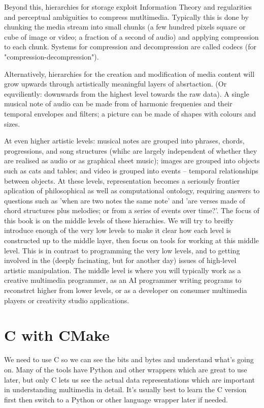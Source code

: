 \documentclass[oneside,english]{scrbook}
\begin{document}
Beyond this, hierarchies for storage exploit Information Theory and regularities and perceptual ambiguities to compress mutltimedia.  Typically this is done by chunking the media stream into small chunks (a few hundred pixels square or cube of image or video; a fraction of a second of audio) and applying compression to each chunk.   Systems for compression and decompression are called codecs (for "compression-decompression"). 

Alternatively, hierarchies for the creation and modification of media content will grow upwards through artistically meaningful layers of absrtaction. (Or equviliently: downwards from the highest level towards the raw data).   A single musical note of audio can be made from of harmonic frequenies and their temporal envelopes and filters; a picture can be made of shapes with colours and sizes.  

At even higher artistic levels: musical notes are grouped into phrases, chords, progressions, and song structures (whihc are largely independent of whether they are realised as audio or as graphical sheet music); images are grouped into objects such as cats and tables; and video is grouped into events -- temporal relationships between objects.  At these levels, representation becomes a seriously frontier aplication of philosophical as well as computational ontology, requiring answers to questions such as 'when are two notes the same note' and 'are verses made of chord structures plus melodies; or from a series of events over time?'. 
The focus of this book is on the middle levels of these hierachies. We will try to breifly introduce enough of the very low levels to make it clear how each level is constructed up to the middle layer, then focus on tools for working at this middle level.   This is in contrast to programming the very low levels, and to getting involved in the (deeply facinating, but for another day) issues of high-level artistic manipulation.   The middle level is where you will typically work as a creative multimedia programmer, as an AI programmer writing programs to reconstrct higher from lower levels, or as a developer on consumer multimedia players or creativity studio applications.

\section{C with CMake}

We need to use C so we can see the bits and bytes and understand what's going on.  Many of the tools have Python and other wrappers which are great to use later, but only C lets us see the actual data representations which are important in understanding multimedia in detail.  It's usually best to learn the C version first then switch to a Python or other language wrapper later if needed.
\end{document}
